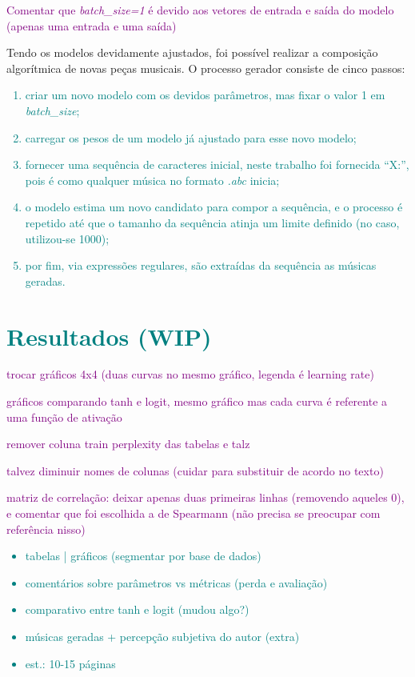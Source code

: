 \documentclass{automatextcc}
\newcommand{\obs}[1]{\textcolor{purple}{#1}}
\newcommand{\nico}[1]{\textcolor{teal}{#1}}
\begin{document}
\obs{Comentar que \textit{batch\_size=1} é devido aos vetores de entrada e saída do modelo (apenas uma entrada e uma saída)}

Tendo os modelos devidamente ajustados, foi possível realizar a composição algorítmica de novas peças musicais. O processo gerador consiste de cinco passos:
\nico{
\begin{enumerate}
    \item criar um novo modelo com os devidos parâmetros, mas fixar o valor 1 em \textit{batch\_size}; 
    \item carregar os pesos de um modelo já ajustado para esse novo modelo;
    \item fornecer uma sequência de caracteres inicial, neste trabalho foi fornecida ``X:'', pois é como qualquer música no formato \textit{.abc} inicia;
    \item o modelo estima um novo candidato para compor a sequência, e o processo é repetido até que o tamanho da sequência atinja um limite definido (no caso, utilizou-se 1000);
    \item por fim, via expressões regulares, são extraídas da sequência as músicas geradas.
\end{enumerate}
}

\chapter{\nico{Resultados (WIP)}}

\obs{trocar gráficos 4x4 (duas curvas no mesmo gráfico, legenda é learning rate)}

\obs{gráficos comparando tanh e logit, mesmo gráfico mas cada curva é referente a uma função de ativação}

\obs{remover coluna train perplexity das tabelas e talz}

\obs{talvez diminuir nomes de colunas (cuidar para substituir de acordo no texto)}

\obs{matriz de correlação: deixar apenas duas primeiras linhas (removendo aqueles 0), e comentar que foi escolhida a de Spearmann (não precisa se preocupar com referência nisso)}

\nico{
\begin{itemize}
    \item tabelas | gráficos (segmentar por base de dados)
    \item comentários sobre parâmetros vs métricas (perda e avaliação)
    \item comparativo entre tanh e logit (mudou algo?)
    \item músicas geradas + percepção subjetiva do autor (extra)
    \item est.: 10-15 páginas 
\end{itemize}
}
\end{document}
